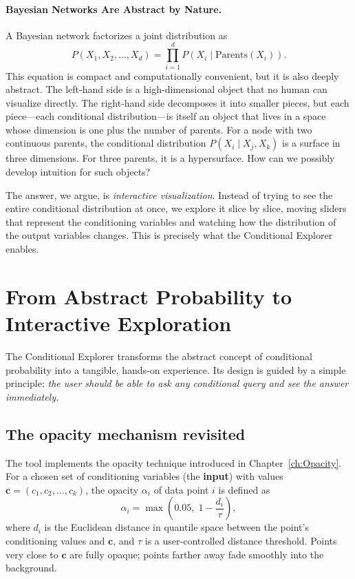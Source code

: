 \paragraph{Bayesian Networks Are Abstract by Nature.}
A Bayesian network factorizes a joint distribution as
\[
P(X_1, X_2, \dots, X_d) = \prod_{i=1}^d P(X_i \mid \text{Parents}(X_i)).
\]
This equation is compact and computationally convenient, but it is also deeply abstract. The left-hand side is a high-dimensional object that no human can visualize directly. The right-hand side decomposes it into smaller pieces, but each piece—each conditional distribution—is itself an object that lives in a space whose dimension is one plus the number of parents. For a node with two continuous parents, the conditional distribution \(P(X_i \mid X_j, X_k)\) is a surface in three dimensions. For three parents, it is a hypersurface. How can we possibly develop intuition for such objects?

The answer, we argue, is \emph{interactive visualization}. Instead of trying to see the entire conditional distribution at once, we explore it slice by slice, moving sliders that represent the conditioning variables and watching how the distribution of the output variables changes. This is precisely what the Conditional Explorer enables.

\section{From Abstract Probability to Interactive Exploration}

The Conditional Explorer transforms the abstract concept of conditional probability into a tangible, hands-on experience. Its design is guided by a simple principle: \emph{the user should be able to ask any conditional query and see the answer immediately.}

\subsection{The opacity mechanism revisited}

The tool implements the opacity technique introduced in Chapter~\ref{ch:Opacity}. For a chosen set of conditioning variables (the \textbf{input}) with values \(\mathbf{c} = (c_1, c_2, \dots, c_k)\), the opacity \(\alpha_i\) of data point \(i\) is defined as
\[
\alpha_i = \max\!\left(0.05,\; 1 - \frac{d_i}{\tau}\right),
\]
where \(d_i\) is the Euclidean distance in quantile space between the point's conditioning values and \(\mathbf{c}\), and \(\tau\) is a user-controlled distance threshold. Points very close to \(\mathbf{c}\) are fully opaque; points farther away fade smoothly into the background.

